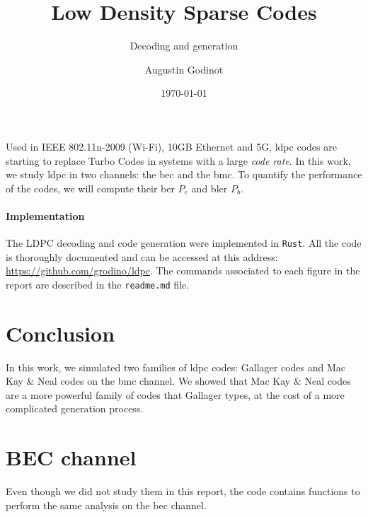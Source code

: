 \documentclass[a4paper]{color-report}
\title{Low Density Sparse Codes}
\author{Augustin Godinot}
\date{\today}
\subtitle{Decoding and generation}
\begin{document}
\maketitle
\tableofcontents
\listoffigures
\listoftables
\printglossary[type=\acronymtype, title=Acronyms]
\newpage

Used in IEEE 802.11n-2009 (Wi-Fi), 10GB Ethernet and 5G, \acrshort{ldpc} codes
are starting to replace Turbo Codes in systems with a large \textit{code rate}.
In this work, we study \acrfull{ldpc} in two channels: the \acrfull{bec} and the
\acrfull{bmc}. To quantify the performance of the codes, we will compute their
\acrfull{ber} $P_e$ and \acrfull{bler} $P_b$.

\paragraph{Implementation} The LDPC decoding and code generation were
implemented in \texttt{Rust}. All the code is thoroughly documented and can be
accessed at this address: \url{https://github.com/grodino/ldpc}. The commands associated to each figure in the
report are described in the \texttt{readme.md} file.





\section*{Conclusion}
In this work, we simulated two families of \acrshort{ldpc} codes: Gallager codes
and Mac Kay \& Neal codes on the \acrshort{bmc} channel. We showed that Mac Kay
\& Neal codes are a more powerful family of codes that Gallager types, at the
cost of a more complicated generation process.
\newpage
\appendix

\section{BEC channel}

Even though we did not study them in this report, the code contains functions to
perform the same analysis on the \acrshort{bec} channel.
\end{document}

